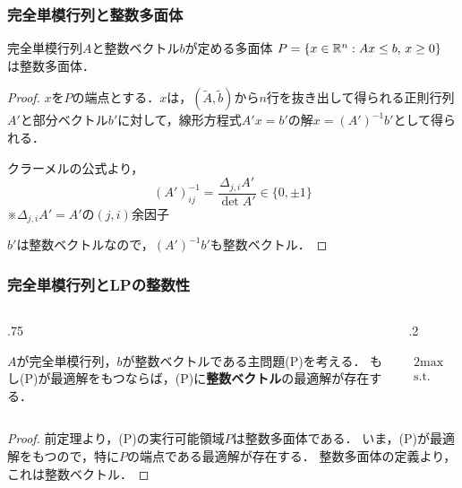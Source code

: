 \documentclass[14pt,aspectratio=169,xcolor=dvipsnames,table,onlytextwidth,dvipdfmx]{beamer}
\begin{document}
\begin{frame}
    \frametitle{完全単模行列と整数多面体}

    \small

    \begin{theorem}
        完全単模行列$A$と整数ベクトル$b$が定める多面体
        $
        P = \{ x \in \mathbb{R}^n : Ax \leq b, \, x \geq 0 \} 
        $
    は整数多面体．
    \end{theorem}
    
    \pause
    \begin{proof}
    $x$を$P$の端点とする．$x$は，$(\tilde A, \tilde b)$から$n$行を抜き出して得られる正則行列$A'$と部分ベクトル$b'$に対して，線形方程式$A' x = b'$の解$x = (A')^{-1}b'$として得られる．

    \pause
    クラーメルの公式より，
    \[
        (A')^{-1}_{ij} = \frac{\Delta_{j,i} A'}{\det A'} \in \{0,\pm 1\}
    \]
    {\footnotesize ※$\Delta_{j,i} A' = A'$の$(j,i)$余因子}

    $b'$は整数ベクトルなので，$(A')^{-1}b'$も整数ベクトル． 
    \end{proof}
\end{frame}

\begin{frame}
    \frametitle{完全単模行列とLPの整数性}
    
    \begin{columns}[T]
    \begin{column}{.75\textwidth}
    \begin{theorem}[]
        $A$が完全単模行列，$b$が整数ベクトルである主問題(P)を考える．
        もし(P)が最適解をもつならば，(P)に\textbf{整数ベクトル}の最適解が存在する．
    \end{theorem}
    \end{column}
    \begin{column}{.2\textwidth}
        \footnotesize
    \begin{primal}
        \setlength{\abovedisplayskip}{0pt}
        \begin{alignat*}{2}
            \text{max} & \quad  c^\top x \\
            \text{s.t.} & \quad A x \leq b  \\
            & \quad x \geq 0 
        \end{alignat*}
    \end{primal}
    \end{column}
    \end{columns}

    \pause \vfill
    \begin{proof}
    前定理より，(P)の実行可能領域$P$は整数多面体である．
    いま，(P)が最適解をもつので，特に$P$の端点である最適解が存在する．
    整数多面体の定義より，これは整数ベクトル． 
    \end{proof}
\end{frame}
\end{document}
